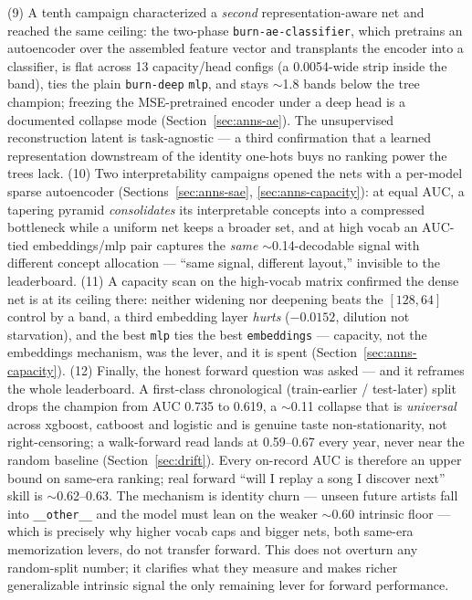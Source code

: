 \documentclass[11pt]{article}
\begin{document}
(9) A tenth campaign characterized a \emph{second} representation-aware net and reached the same ceiling: the two-phase \texttt{burn-ae-classifier}, which pretrains an autoencoder over the assembled feature vector and transplants the encoder into a classifier, is flat across 13 capacity/head configs (a \num{0.0054}-wide strip inside the band), ties the plain \texttt{burn-deep} \texttt{mlp}, and stays $\sim$1.8 bands below the tree champion; freezing the MSE-pretrained encoder under a deep head is a documented collapse mode (Section~\ref{sec:anns-ae}). The unsupervised reconstruction latent is task-agnostic --- a third confirmation that a learned representation downstream of the identity one-hots buys no ranking power the trees lack.
(10) Two interpretability campaigns opened the nets with a per-model sparse autoencoder (Sections~\ref{sec:anns-sae}, \ref{sec:anns-capacity}): at equal AUC, a tapering pyramid \emph{consolidates} its interpretable concepts into a compressed bottleneck while a uniform net keeps a broader set, and at high vocab an AUC-tied embeddings/mlp pair captures the \emph{same} $\sim$0.14-decodable signal with different concept allocation --- ``same signal, different layout,'' invisible to the leaderboard.
(11) A capacity scan on the high-vocab matrix confirmed the dense net is at its ceiling there: neither widening nor deepening beats the $[128,64]$ control by a band, a third embedding layer \emph{hurts} ($-\num{0.0152}$, dilution not starvation), and the best \texttt{mlp} ties the best \texttt{embeddings} --- capacity, not the embeddings mechanism, was the lever, and it is spent (Section~\ref{sec:anns-capacity}).
(12) Finally, the honest forward question was asked --- and it reframes the whole leaderboard. A first-class chronological (train-earlier / test-later) split drops the champion from AUC \num{0.735} to \num{0.619}, a $\sim$0.11 collapse that is \emph{universal} across xgboost, catboost and logistic and is genuine taste non-stationarity, not right-censoring; a walk-forward read lands at \num{0.59}--\num{0.67} every year, never near the random baseline (Section~\ref{sec:drift}). Every on-record AUC is therefore an upper bound on same-era ranking; real forward ``will I replay a song I discover next'' skill is $\sim$0.62--0.63. The mechanism is identity churn --- unseen future artists fall into \texttt{\_\_other\_\_} and the model must lean on the weaker $\sim$0.60 intrinsic floor --- which is precisely why higher vocab caps and bigger nets, both same-era memorization levers, do not transfer forward. This does not overturn any random-split number; it clarifies what they measure and makes richer generalizable intrinsic signal the only remaining lever for forward performance.
\end{document}
